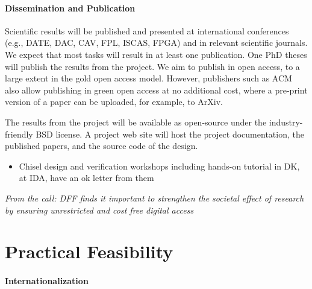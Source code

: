 \documentclass[fleqn,12pt]{article}
\begin{document}
\paragraph*{Dissemination and Publication}

Scientific results will be published and presented at international
conferences (e.g., DATE, DAC, CAV, FPL, ISCAS, FPGA) and in relevant scientific journals.
We expect that most tasks will result in at least one publication.
One PhD theses will publish the results from the project.
We aim to publish in open access, to a large extent in the gold open access model.
However, publishers such as ACM also allow publishing in green open access
at no additional cost, where a pre-print version of a paper can be uploaded,
for example, to ArXiv.

The results from the project will be available as open-source under the
industry-friendly BSD license.
A project web site will host the project documentation, the published papers, and the
source code of the design.

\begin{itemize}
\item Chisel design and verification workshops including hands-on tutorial in DK, at IDA, have an ok letter from them
\end{itemize}


\emph{From the call: DFF finds it important to strengthen the societal effect of research by ensuring unrestricted and cost free digital access}



\section{Practical Feasibility}


\paragraph*{Internationalization}
\end{document}

